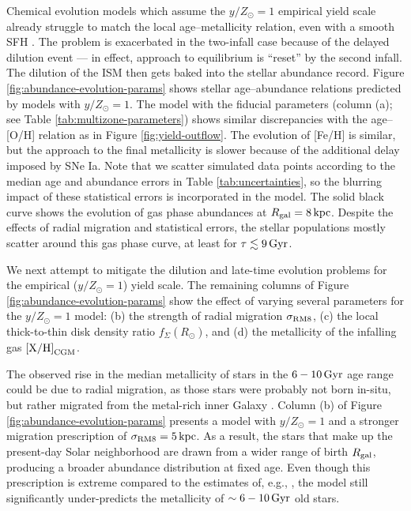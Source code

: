 \documentclass[twocolumn,twocolappendix,linenumbers]{aastex631}
\newcommand{\mathXH}{{\rm [X/H]}}
\newcommand{\yZ}[1]{$y/Z_\odot=#1$}
\newcommand{\kpc}{\,{\rm kpc}}
\newcommand{\Gyr}{\,{\rm Gyr}}
\begin{document}
Chemical evolution models which assume the \yZ{1} empirical yield scale already struggle to match the local age--metallicity relation, even with a smooth SFH \citep[see also][]{johnson_milky_2024}. The problem is exacerbated in the two-infall case because of the delayed dilution event --- in effect, approach to equilibrium is ``reset'' by the second infall. The dilution of the ISM then gets baked into the stellar abundance record.
Figure \ref{fig:abundance-evolution-params} shows stellar age--abundance relations predicted by models with \yZ{1}. The model with the fiducial parameters (column (a); see Table \ref{tab:multizone-parameters}) shows similar discrepancies with the \citet{leung_variational_2023} age--[O/H] relation as in Figure \ref{fig:yield-outflow}.
The evolution of [Fe/H] is similar, but the approach to the final metallicity is slower because of the additional delay imposed by SNe Ia. Note that we scatter simulated data points according to the median age and abundance errors in Table \ref{tab:uncertainties}, so the blurring impact of these statistical errors is incorporated in the model. The solid black curve shows the evolution of gas phase abundances at $R_{\rm gal}=8\kpc$. Despite the effects of radial migration and statistical errors, the stellar populations mostly scatter around this gas phase curve, at least for $\tau\lesssim9\Gyr$.

We next attempt to mitigate the dilution and late-time evolution problems for the empirical (\yZ{1}) yield scale. 
The remaining columns of Figure \ref{fig:abundance-evolution-params} show the effect of varying several parameters for the \yZ{1} model: (b) the strength of radial migration $\sigma_{\rm RM8}$, (c) the local thick-to-thin disk density ratio $f_\Sigma(R_\odot)$, and (d) the metallicity of the infalling gas $\mathXH_{\rm CGM}$.

The observed rise in the median metallicity of stars in the $6-10\Gyr$ age range could be due to radial migration, as those stars were probably not born in-situ, but rather migrated from the metal-rich inner Galaxy \citep{feuillet_age-resolved_2018}. Column (b) of Figure \ref{fig:abundance-evolution-params} presents a model with $y/Z_\odot=1$ and a stronger migration prescription of $\sigma_{\rm RM8}=5\kpc$. As a result, the stars that make up the present-day Solar neighborhood are drawn from a wider range of birth $R_{\rm gal}$, producing a broader abundance distribution at fixed age. Even though this prescription is extreme compared to the estimates of, e.g., \citet{frankel_measuring_2018}, the model still significantly under-predicts the metallicity of $\sim6-10\,{\rm Gyr}$ old stars.
\end{document}
